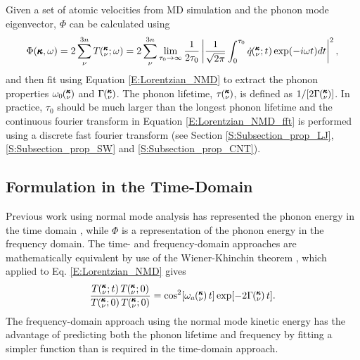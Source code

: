 Given a set of atomic velocities 
from MD simulation and the phonon mode eigenvector, $\Phi$ can be 
calculated using
\begin{equation}\label{E:Lorentzian_NMD_fft}
\begin{split}
\Phi(\pmb{\kappa},\omega) = 2\sum_{\nu}^{3n} T\mspace{-4.0mu}\left(\mspace{-8.0mu} \begin{smallmatrix}&\pmb{\kappa} \\&\nu\end{smallmatrix} \mspace{-2.0mu};\omega\right)=2\sum_{\nu}^{3n} 
\lim_{\tau_0\rightarrow\infty}\frac{1}{2\tau_0}\left|
\frac{1}{\sqrt{2\pi}}\int_{0}^{\tau_0}\dot{q}\mspace{-4.0mu}\left(\mspace{-8.0mu} \begin{smallmatrix}&\pmb{\kappa} \\&\nu\end{smallmatrix} \mspace{-2.0mu};t\right)
\exp(-i\omega t)dt\right|^2,
\end{split}
\end{equation}
and then fit using 
Equation \eqref{E:Lorentzian_NMD} to extract the phonon properties 
$\omega_0\mspace{-4.0mu}\left(\mspace{-8.0mu} \begin{smallmatrix}&\pmb{\kappa} \\&\nu\end{smallmatrix} \mspace{-3.0mu}\right)$ and $\Gamma\mspace{-4.0mu}\left(\mspace{-8.0mu} \begin{smallmatrix}&\pmb{\kappa} \\&\nu\end{smallmatrix} \mspace{-3.0mu}\right)$. 
The phonon lifetime, $\tau \mspace{-4.0mu}\left(\mspace{-8.0mu} \begin{smallmatrix}&\pmb{\kappa} \\&\nu\end{smallmatrix} \mspace{-3.0mu}\right)$, is defined as $1/[2 \Gamma \mspace{-4.0mu}\left(\mspace{-8.0mu} \begin{smallmatrix}&\pmb{\kappa} \\&\nu\end{smallmatrix} \mspace{-3.0mu}\right)]$. 
In practice, $\tau_0$ should 
be much larger than the longest phonon lifetime and the continuous 
fourier transform in 
Equation \eqref{E:Lorentzian_NMD_fft}  
is performed using a discrete fast fourier transform (see Section 
\ref{S:Subsection_prop_LJ}, 
\ref{S:Subsection_prop_SW} and \ref{S:Subsection_prop_CNT}).

\subsection{\label{S:Subsection_SED_time-domain}Formulation in the 
Time-Domain}

Previous work using normal mode analysis has represented the phonon 
energy in the time domain 
\cite{ladd_lattice_1986,mcgaughey_quantitative_2004,
henry_spectral_2008,turney_predicting_2009,
goicochea_thermal_2010,he_thermal_2011}, while $\Phi$ is a 
representation of the phonon energy in the frequency domain. The 
time- and frequency-domain 
approaches are mathematically equivalent by use of the 
Wiener-Khinchin theorem 
\cite{rudin_real_1987,shiomi_thermal_2011}, which applied to Eq. 
\eqref{E:Lorentzian_NMD} gives 
\begin{equation}\label{E:xcorr_NMD}
\begin{split}
\frac{T\kvt T\kvzero}{T \kvzero T\kvzero} =\cos^2[\omega_a \kv t] 
\exp[-2 \Gamma \kv t].
\end{split}
\end{equation}
The frequency-domain approach using the normal mode kinetic 
energy has the advantage of predicting both the phonon lifetime 
and frequency by fitting a simpler function than is required in the 
time-domain approach.

